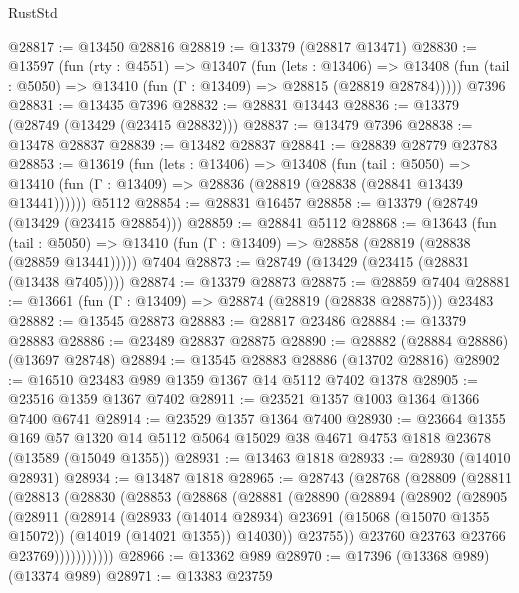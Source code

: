 \begin{lexlean}{RustStd}
\begin{coremodule}
@28817 := @13450 @28816
@28819 := @13379 (@28817 @13471)
@28830 := @13597
    (fun (rty : @4551) =>
    @13407
      (fun (lets : @13406) =>
      @13408 (fun (tail : @5050) => @13410 (fun (Γ : @13409) => @28815 (@28819 @28784)))))
    @7396
@28831 := @13435 @7396
@28832 := @28831 @13443
@28836 := @13379 (@28749 (@13429 (@23415 @28832)))
@28837 := @13479 @7396
@28838 := @13478 @28837
@28839 := @13482 @28837
@28841 := @28839 @28779 @23783
@28853 := @13619
    (fun (lets : @13406) =>
    @13408
      (fun (tail : @5050) =>
      @13410 (fun (Γ : @13409) => @28836 (@28819 (@28838 (@28841 @13439 @13441))))))
    @5112
@28854 := @28831 @16457
@28858 := @13379 (@28749 (@13429 (@23415 @28854)))
@28859 := @28841 @5112
@28868 := @13643
    (fun (tail : @5050) => @13410 (fun (Γ : @13409) => @28858 (@28819 (@28838 (@28859 @13441)))))
    @7404
@28873 := @28749 (@13429 (@23415 (@28831 (@13438 @7405))))
@28874 := @13379 @28873
@28875 := @28859 @7404
@28881 := @13661 (fun (Γ : @13409) => @28874 (@28819 (@28838 @28875))) @23483
@28882 := @13545 @28873
@28883 := @28817 @23486
@28884 := @13379 @28883
@28886 := @23489 @28837 @28875
@28890 := @28882 (@28884 @28886) (@13697 @28748)
@28894 := @13545 @28883 @28886 (@13702 @28816)
@28902 := @16510 @23483 @989 @1359 @1367 @14 @5112 @7402 @1378
@28905 := @23516 @1359 @1367 @7402
@28911 := @23521 @1357 @1003 @1364 @1366 @7400 @6741
@28914 := @23529 @1357 @1364 @7400
@28930 := @23664
    @1355
    @169
    @57
    @1320
    @14
    @5112
    @5064
    @15029
    @38
    @4671
    @4753
    @1818
    @23678
    (@13589 (@15049 @1355))
@28931 := @13463 @1818
@28933 := @28930 (@14010 @28931)
@28934 := @13487 @1818
@28965 := @28743
    (@28768
      (@28809
        (@28811
          (@28813
            (@28830
              (@28853
                (@28868
                  (@28881
                    (@28890
                      (@28894
                        (@28902
                          (@28905
                            (@28911
                              (@28914
                                (@28933
                                  (@14014 @28934)
                                  @23691
                                  (@15068 (@15070 @1355 @15072))
                                  (@14019 (@14021 @1355))
                                  @14030))
                              @23755))
                          @23760
                          @23763
                          @23766
                          @23769)))))))))))
@28966 := @13362 @989
@28970 := @17396 (@13368 @989) (@13374 @989)
@28971 := @13383 @23759

\end{coremodule}
\end{lexlean}
